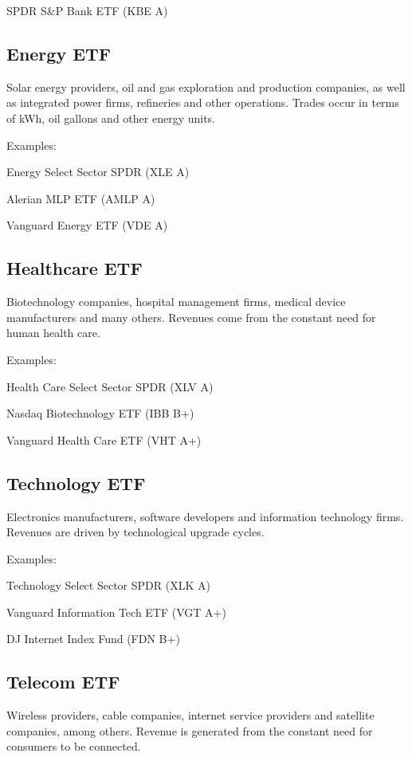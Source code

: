 \documentclass[11pt]{article}
\begin{document}
SPDR S\&P Bank ETF (KBE A)


\subsection{Energy ETF}

Solar energy providers, oil and gas exploration and production companies, as well as integrated power firms, refineries and other operations. Trades occur in terms of kWh, oil gallons and other energy units.


Examples:


Energy Select Sector SPDR (XLE A)


Alerian MLP ETF (AMLP A)


Vanguard Energy ETF (VDE A)


\subsection{Healthcare ETF}

Biotechnology companies, hospital management firms, medical device manufacturers and many others. Revenues come from the constant need for human health care.


Examples:


Health Care Select Sector SPDR (XLV A)


Nasdaq Biotechnology ETF (IBB B+)


Vanguard Health Care ETF (VHT A+)


\subsection{Technology ETF}

Electronics manufacturers, software developers and information technology firms. Revenues are driven by technological upgrade cycles.


Examples:


Technology Select Sector SPDR (XLK A)


Vanguard Information Tech ETF (VGT A+)


DJ Internet Index Fund (FDN B+)


\subsection{Telecom ETF}

Wireless providers, cable companies, internet service providers and satellite companies, among others. Revenue is generated from the constant need for consumers to be connected.
\end{document}
